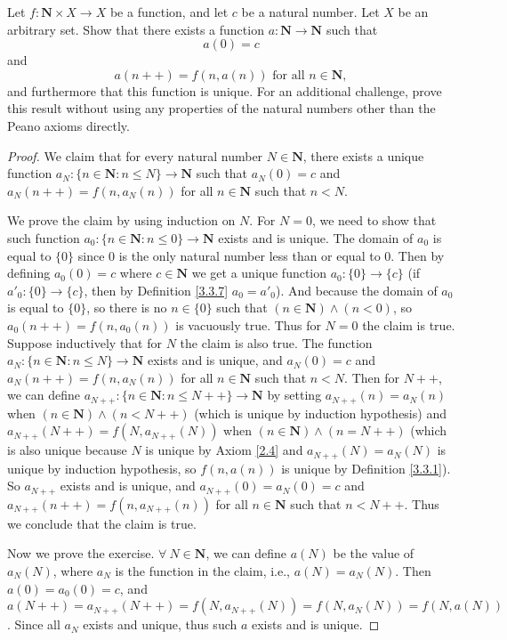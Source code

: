 \begin{exercise}\label{ex 3.5.12}
Let \(f : \mathbf{N} \times X \to X\) be a function, and let \(c\) be a natural number.
Let \(X\) be an arbitrary set.
Show that there exists a function \(a : \mathbf{N} \to \mathbf{N}\) such that
\[
    a(0) = c
\]
and
\[
    a(n++) = f(n, a(n)) \text{ for all } n \in \mathbf{N},
\]
and furthermore that this function is unique.
For an additional challenge, prove this result without using any properties of the natural numbers other than the Peano axioms directly.
\end{exercise}

\begin{proof}
We claim that for every natural number \(N \in \mathbf{N}\), there exists a unique function \(a_N : \{n \in \mathbf{N} : n \leq N\} \to \mathbf{N}\) such that \(a_N(0) = c\) and \(a_N(n++) = f(n, a_{N}(n))\) for all \(n \in \mathbf{N}\) such that \(n < N\).

We prove the claim by using induction on \(N\).
For \(N = 0\), we need to show that such function \(a_0 : \{n \in \mathbf{N} : n \leq 0\} \to \mathbf{N}\) exists and is unique.
The domain of \(a_0\) is equal to \(\{0\}\) since \(0\) is the only natural number less than or equal to \(0\).
Then by defining \(a_0(0) = c\) where \(c \in \mathbf{N}\) we get a unique function \(a_0 : \{0\} \to \{c\}\) (if \(a'_0 : \{0\} \to \{c\}\), then by Definition \ref{3.3.7} \(a_0 = a'_0\)).
And because the domain of \(a_0\) is equal to \(\{0\}\), so there is no \(n \in \{0\}\) such that \((n \in \mathbf{N}) \land (n < 0)\), so \(a_0(n++) = f(n, a_0(n))\) is vacuously true.
Thus for \(N = 0\) the claim is true.
Suppose inductively that for \(N\) the claim is also true.
The function \(a_N : \{n \in \mathbf{N} : n \leq N\} \to \mathbf{N}\) exists and is unique, and \(a_N(0) = c\) and \(a_N(n++) = f(n, a_N(n))\) for all \(n \in \mathbf{N}\) such that \(n < N\).
Then for \(N++\), we can define \(a_{N++} : \{n \in \mathbf{N} : n \leq N++\} \to \mathbf{N}\) by setting \(a_{N++}(n) = a_N(n)\) when \((n \in \mathbf{N}) \land (n < N++)\) (which is unique by induction hypothesis) and \(a_{N++}(N++) = f(N, a_{N++}(N))\) when \((n \in \mathbf{N}) \land (n = N++)\) (which is also unique because \(N\) is unique by Axiom \ref{2.4} and \(a_{N++}(N) = a_N(N)\) is unique by induction hypothesis, so \(f(n, a(n))\) is unique by Definition \ref{3.3.1}).
So \(a_{N++}\) exists and is unique, and \(a_{N++}(0) = a_N(0) = c\) and \(a_{N++}(n++) = f(n, a_{N++}(n))\) for all \(n \in \mathbf{N}\) such that \(n < N++\).
Thus we conclude that the claim is true.

Now we prove the exercise.
\(\forall\ N \in \mathbf{N}\), we can define \(a(N)\) be the value of \(a_N(N)\), where \(a_N\) is the function in the claim, i.e., \(a(N) = a_{N}(N)\).
Then \(a(0) = a_0(0) = c\), and \(a(N++) = a_{N++}(N++) = f(N, a_{N++}(N)) = f(N, a_{N}(N)) = f(N, a(N))\).
Since all \(a_N\) exists and unique, thus such \(a\) exists and is unique.
\end{proof}

